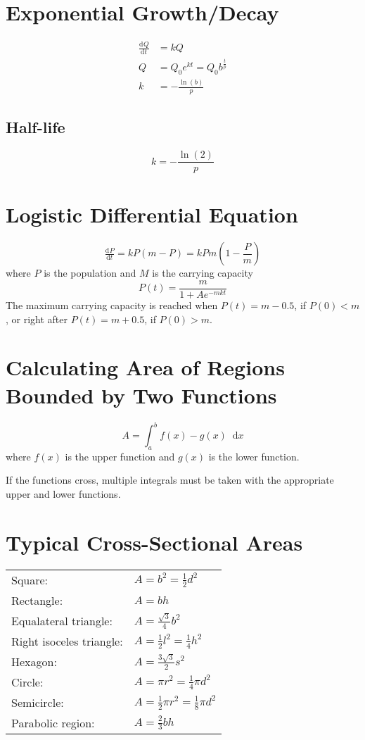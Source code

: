 \documentclass[12pt]{article}
\newcommand*{\rmaskip}{\setlength{\abovedisplayskip}{0pt}}
\newcommand*{\rmbskip}{\setlength{\belowdisplayskip}{0pt}}
\newcommand*{\rmskip}{\rmaskip \rmbskip}
\newcommand*{\dd}[3][]{\tfrac{\mathrm{d}^{#1}#2}{\mathrm{d}#3^{#1}}}
\newcommand*{\D}[1]{\mathop{}\!\mathrm{d} #1}
\begin{document}
\section*{Exponential Growth\slash Decay}
{\rmskip\begin{align*}
  \dd{Q}{t} &= kQ\\
  Q &= Q_0 e^{kt} = Q_0 b^{\frac{t}{p}}\\
  k &= -\frac{\ln(b)}{p}
\end{align*}}%
\subsection*{Half-life}
\[
  k = -\frac{\ln(2)}{p}
\]
\section*{Logistic Differential Equation}
\[
  \dd{P}{t} = kP(m - P) = kPm\left(1-\frac{P}{m}\right)
\]
where \(P\) is the population and \(M\) is the carrying capacity
\[
  P(t) = \frac{m}{1 + Ae^{-mkt}}
\]
The maximum carrying capacity is reached when \(P(t) = m - 0.5\), if \(P(0) <
m\), or right after \(P(t) = m + 0.5\), if \(P(0) > m\).
\section*{Calculating Area of Regions Bounded by Two Functions}
\[
  A = \int_a^b f(x) - g(x) \D{x}
\]
where \(f(x)\) is the upper function and \(g(x)\) is the lower function.

If the functions cross, multiple integrals must be taken with the appropriate
upper and lower functions.
\section*{Typical Cross-Sectional Areas}
{\renewcommand{\arraystretch}{1.5}\begin{tabular}{l@{ }l}
  Square: & \(A = b^2 = \frac{1}{2}d^2\)\\
  Rectangle: & \(A = bh\)\\
  Equalateral triangle: & \(A = \frac{\sqrt{3}}{4}b^2\)\\
  Right isoceles triangle: & \(A = \frac{1}{2}l^2 = \frac{1}{4}h^2\)\\
  Hexagon: & \(A = \frac{3\sqrt{3}}{2} s^2\)\\
  Circle: & \(A = \pi r^2 = \frac{1}{4}\pi d^2\)\\
  Semicircle: & \(A = \frac{1}{2}\pi r^2 = \frac{1}{8}\pi d^2\)\\
  Parabolic region: & \(A = \frac{2}{3}bh\)
\end{tabular}}
\end{document}

